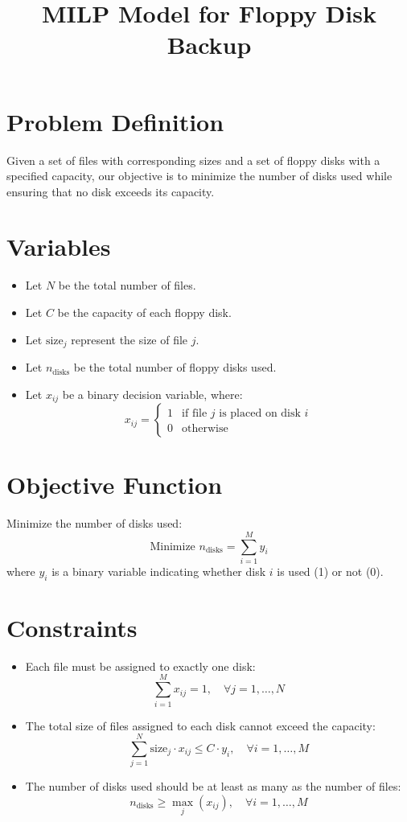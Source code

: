 \documentclass{article}
\begin{document}
\title{MILP Model for Floppy Disk Backup}
\author{}
\date{}
\maketitle

\section*{Problem Definition}
Given a set of files with corresponding sizes and a set of floppy disks with a specified capacity, our objective is to minimize the number of disks used while ensuring that no disk exceeds its capacity.

\section*{Variables}
\begin{itemize}
    \item Let \( N \) be the total number of files.
    \item Let \( C \) be the capacity of each floppy disk.
    \item Let \( \text{size}_j \) represent the size of file \( j \).
    \item Let \( n_{\text{disks}} \) be the total number of floppy disks used.
    \item Let \( x_{ij} \) be a binary decision variable, where:
    \[
    x_{ij} = 
    \begin{cases} 
    1 & \text{if file } j \text{ is placed on disk } i \\
    0 & \text{otherwise}
    \end{cases}
    \]
\end{itemize}

\section*{Objective Function}
Minimize the number of disks used:
\[
\text{Minimize } n_{\text{disks}} = \sum_{i=1}^{M} y_i
\]
where \( y_i \) is a binary variable indicating whether disk \( i \) is used (1) or not (0).

\section*{Constraints}
\begin{itemize}
    \item Each file must be assigned to exactly one disk:
    \[
    \sum_{i=1}^{M} x_{ij} = 1, \quad \forall j = 1, \ldots, N
    \]
    
    \item The total size of files assigned to each disk cannot exceed the capacity:
    \[
    \sum_{j=1}^{N} \text{size}_j \cdot x_{ij} \leq C \cdot y_i, \quad \forall i = 1, \ldots, M
    \]
    
    \item The number of disks used should be at least as many as the number of files:
    \[
    n_{\text{disks}} \geq \max_{j} (x_{ij}), \quad \forall i = 1, \ldots, M
    \]
\end{itemize}
\end{document}
